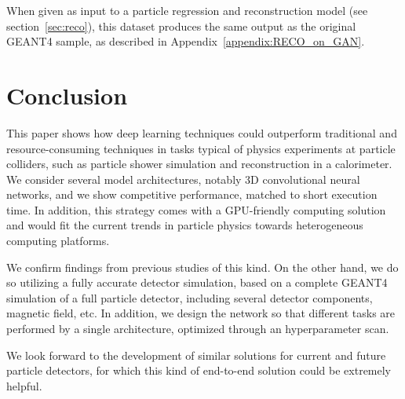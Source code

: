 When given as input to a particle regression and reconstruction model (see section~\ref{sec:reco}), this dataset produces the same output as the original GEANT4 sample, as described in Appendix~\ref{appendix:RECO_on_GAN}.

\section{Conclusion}

This paper shows how deep learning techniques could outperform traditional and resource-consuming techniques in  tasks typical of physics experiments at particle colliders, such as particle shower simulation and reconstruction in a calorimeter.
We consider several model architectures, notably 3D convolutional neural networks, and we show competitive performance, matched to short execution time. In addition, this strategy comes with a GPU-friendly computing solution and would fit the current trends in particle physics towards heterogeneous computing platforms. 

We confirm findings from previous studies of this kind. On the other hand, we do so utilizing a fully accurate detector simulation, based on a complete GEANT4 simulation of a full particle detector, including several detector components, magnetic field, etc. In addition, we design the network so that different tasks are performed by a single architecture, optimized through an hyperparameter scan. 

We look forward to the development of similar solutions for current and future particle detectors, for which this kind of end-to-end solution could be extremely helpful. 